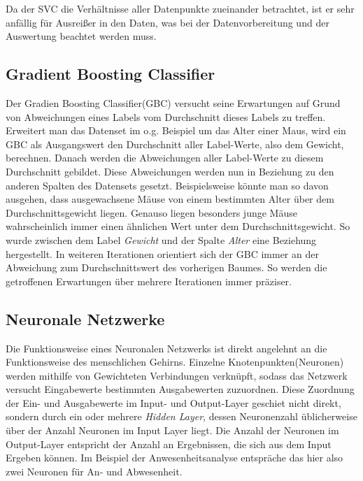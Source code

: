 Da der SVC die Verhältnisse aller Datenpunkte zueinander betrachtet, ist er sehr anfällig für Ausreißer in 
den Daten, was bei der Datenvorbereitung und der Auswertung beachtet werden muss.

\subsection{Gradient Boosting Classifier}
Der Gradien Boosting Classifier(GBC) versucht seine Erwartungen auf Grund von Abweichungen eines Labels vom 
Durchschnitt dieses Labels zu treffen. Erweitert man das Datenset im o.g. Beispiel um das Alter einer Maus, wird 
ein GBC als Ausgangswert den Durchschnitt aller Label-Werte, also dem Gewicht, berechnen. Danach werden die 
Abweichungen aller Label-Werte zu diesem Durchschnitt gebildet. Diese Abweichungen werden nun in Beziehung zu den 
anderen Spalten des Datensets gesetzt. Beispielsweise könnte man so davon ausgehen, dass ausgewachsene Mäuse von einem 
bestimmten Alter über dem Durchschnittsgewicht liegen. Genauso liegen besonders junge Mäuse wahrscheinlich immer
einen ähnlichen Wert unter dem Durchschnittsgewicht. So wurde zwischen dem Label \textit{Gewicht} und der Spalte 
\textit{Alter} eine Beziehung hergestellt. In weiteren Iterationen orientiert sich der GBC immer an der Abweichung 
zum Durchschnittswert des vorherigen Baumes. So werden die getroffenen Erwartungen über mehrere Iterationen immer 
präziser.\newpage

\subsection{Neuronale Netzwerke}
Die Funktionsweise eines Neuronalen Netzwerks ist direkt angelehnt an die Funktionsweise des menschlichen Gehirns.
Einzelne Knotenpunkten(Neuronen) werden mithilfe von Gewichteten Verbindungen verknüpft, sodass das Netzwerk versucht 
Eingabewerte bestimmten Ausgabewerten zuzuordnen. Diese Zuordnung der Ein- und Ausgabewerte im Input- und Output-Layer 
geschiet nicht direkt, sondern durch ein oder mehrere \textit{Hidden Layer}, dessen Neuronenzahl üblicherweise über 
der Anzahl Neuronen im Input Layer liegt. Die Anzahl der Neuronen im Output-Layer entspricht der Anzahl an Ergebnissen, 
die sich aus dem Input Ergeben können. Im Beispiel der Anwesenheitsanalyse entspräche das hier also zwei Neuronen für 
An- und Abwesenheit.

